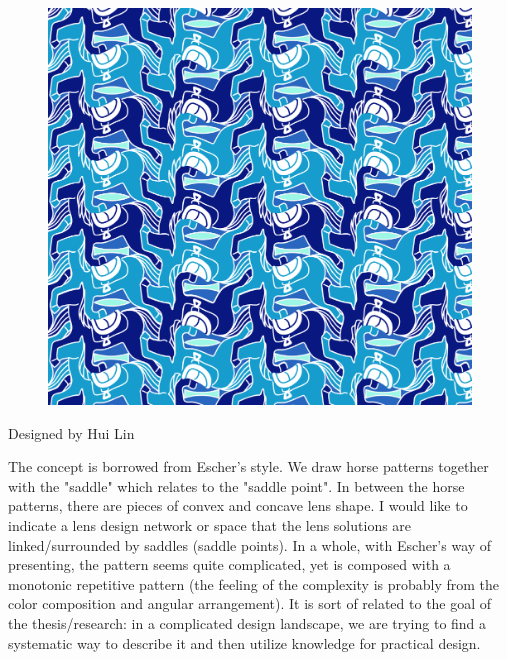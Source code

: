 \begin{titlepage}
\newpage
\;
\vspace{12em}



\begin{figure}[h!]
    \centering
    \includegraphics[scale=0.35]{cover/CoverSP.png}
\end{figure} 
Designed by Hui Lin

 The concept is borrowed from Escher's style. We draw horse patterns together with the "saddle" which relates to the "saddle point". In between the horse patterns, there are pieces of convex and concave lens shape. I would like to indicate a lens design network or space that the lens solutions are linked/surrounded by saddles (saddle points). In a whole, with Escher's way of presenting, the pattern seems quite complicated, yet is composed with a monotonic repetitive pattern (the feeling of the complexity is probably from the color composition and angular arrangement). It is sort of related to the goal of the thesis/research: in a complicated design landscape, we are trying to find a systematic way to describe it and then utilize knowledge for practical design. 

\end{titlepage}

